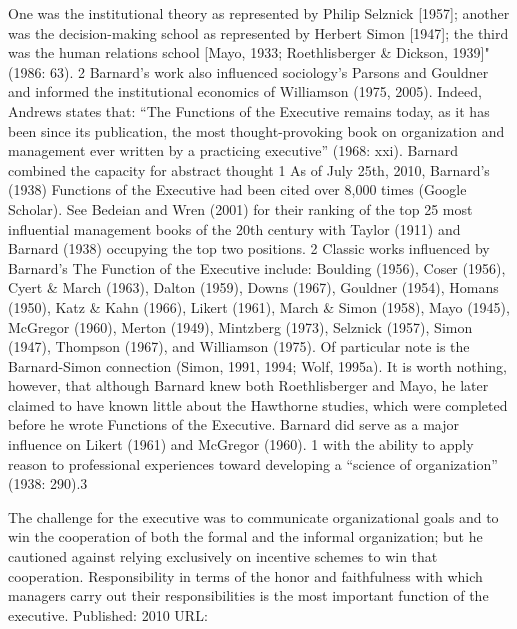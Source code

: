 One was the institutional theory as represented by Philip Selznick [1957]; another was the decision-making school as represented by Herbert Simon [1947]; the third was the human relations school [Mayo, 1933; Roethlisberger \& Dickson, 1939]" (1986: 63). 2 Barnard’s work also influenced sociology’s Parsons and Gouldner and informed the institutional economics of Williamson (1975, 2005). Indeed, Andrews states that: “The Functions of the Executive remains today, as it has been since its publication, the most thought-provoking book on organization and management ever written by a practicing executive” (1968: xxi). Barnard combined the capacity for abstract thought 1 As of July 25th, 2010, Barnard’s (1938) Functions of the Executive had been cited over 8,000 times (Google Scholar). See Bedeian and Wren (2001) for their ranking of the top 25 most influential management books of the 20th century with Taylor (1911) and Barnard (1938) occupying the top two positions. 2 Classic works influenced by Barnard’s The Function of the Executive include: Boulding (1956), Coser (1956), Cyert \& March (1963), Dalton (1959), Downs (1967), Gouldner (1954), Homans (1950), Katz \& Kahn (1966), Likert (1961), March \& Simon (1958), Mayo (1945), McGregor (1960), Merton (1949), Mintzberg (1973), Selznick (1957), Simon (1947), Thompson (1967), and Williamson (1975). Of particular note is the Barnard-Simon connection (Simon, 1991, 1994; Wolf, 1995a). It is worth nothing, however, that although Barnard knew both Roethlisberger and Mayo, he later claimed to have known little about the Hawthorne studies, which were completed before he wrote Functions of the Executive. Barnard did serve as a major influence on Likert (1961) and McGregor (1960). 1 with the ability to apply reason to professional experiences toward developing a “science of organization” (1938: 290).3

The challenge for the executive was to communicate organizational goals and to win the cooperation of both the formal and the informal organization; but he cautioned against relying exclusively on incentive schemes to win that cooperation. Responsibility in terms of the honor and faithfulness with which managers carry out their responsibilities is the most important function of the executive. Published: 2010 URL: 

